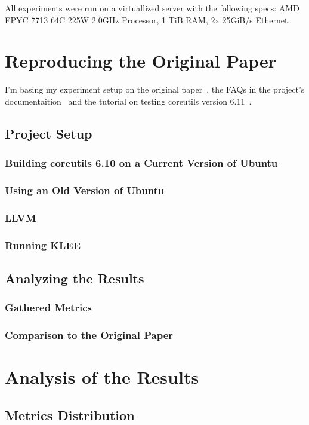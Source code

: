 \documentclass{article}
\let\savedCite=\cite
\renewcommand{\cite}{\unskip~\savedCite}
\begin{document}
\begin{multicols}{2}
    All experiments were run on a virtuallized server with the following specs: AMD EPYC 7713 64C 225W 2.0GHz Processor, 1 TiB RAM, 2x 25GiB/s Ethernet.

    \section{Reproducing the Original Paper}
    \label{Reproducing}
    I'm basing my experiment setup on the original paper\cite{KLEE}, the FAQs in the project's documentaition\cite{KLEEFAQ} and the tutorial on testing coreutils version 6.11\cite{KLEETutorial}.

    \subsection{Project Setup}
    \subsubsection{Building coreutils 6.10 on a Current Version of Ubuntu}
    \subsubsection{Using an Old Version of Ubuntu}
    \subsubsection{LLVM}
    \subsubsection{Running KLEE}

    \subsection{Analyzing the Results}
    \subsubsection{Gathered Metrics}
    \subsubsection{Comparison to the Original Paper}

    \section{Analysis of the Results}
    \label{Timeouts}
    \subsection{Metrics Distribution}

\end{multicols}
\end{document}
